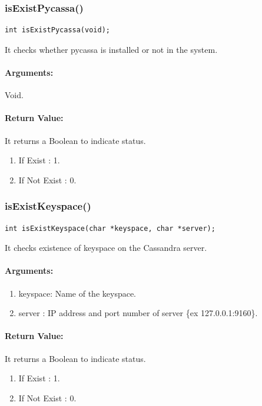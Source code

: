 \subsubsection{isExistPycassa()}
\begin{verbatim}
int isExistPycassa(void);
\end{verbatim}

  It checks whether pycassa is installed or not in the system.

  \paragraph{Arguments:} Void.

 \paragraph{Return Value:}
 It returns a Boolean to indicate status.
\begin{enumerate}
 \item If Exist : 1.
 \item If Not Exist   : 0.
\end{enumerate}


\subsubsection{isExistKeyspace()}
\begin{verbatim}
int isExistKeyspace(char *keyspace, char *server);
\end{verbatim}

  It checks existence of keyspace on the Cassandra server.

  \paragraph{Arguments:} 
	        \begin{enumerate}
		    \item keyspace: Name of the keyspace.
		    \item server : IP address and port number of server \{ex 127.0.0.1:9160\}.
		\end{enumerate}
		
 \paragraph{Return Value:}
 It returns a Boolean to indicate status.
\begin{enumerate}
 \item If Exist : 1.
 \item If Not Exist   : 0.
\end{enumerate}

